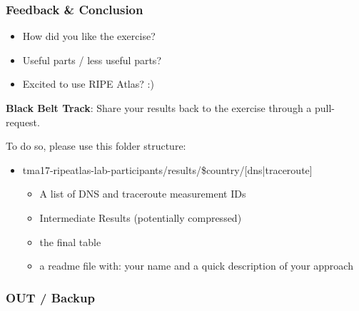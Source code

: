 \begin{frame}
\frametitle{Feedback \& Conclusion}
\begin{itemize}
	\item How did you like the exercise?
	\item Useful parts / less useful parts?
	\item Excited to use RIPE Atlas? :)
\end{itemize}
\vspace{10mm}
\textbf{Black Belt Track}: Share your results back to the exercise through a pull-request. 

To do so, please use this folder structure:
\begin{itemize}
	\item tma17-ripeatlas-lab-participants/results/\$country/[dns|traceroute]
	\begin{itemize}
		\item A list of DNS and traceroute measurement IDs
		\item Intermediate Results (potentially compressed)
		\item the final table
		\item a readme file with: your name and a quick description of your approach
	\end{itemize}
\end{itemize}

\end{frame}
\clearpage



\begin{frame}
\frametitle{OUT / Backup}
\end{frame}
\clearpage


